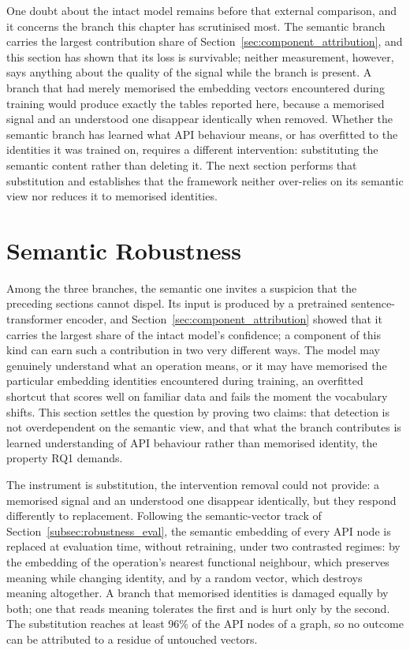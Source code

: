 \documentclass[%
    BCOR=10mm,
    DIV=13,
    toc=bibliography,
    toc=listof,
    oneside,
    12pt,
]{scrbook}
\begin{document}
One doubt about the intact model remains before that external comparison,
and it concerns the branch this chapter has scrutinised most. The semantic
branch carries the largest contribution share of
Section~\ref{sec:component_attribution}, and this section has shown that its
loss is survivable; neither measurement, however, says anything about the
quality of the signal while the branch is present. A branch that had merely
memorised the embedding vectors encountered during training would produce
exactly the tables reported here, because a memorised signal and an
understood one disappear identically when removed. Whether the semantic
branch has learned what API behaviour means, or has overfitted to the
identities it was trained on, requires a different intervention: substituting
the semantic content rather than deleting it. The next section performs that
substitution and establishes that the framework neither over-relies on its
semantic view nor reduces it to memorised identities.


\section{Semantic Robustness}
\label{sec:robustness_results}

Among the three branches, the semantic one invites a suspicion that the
preceding sections cannot dispel. Its input is produced by a pretrained
sentence-transformer encoder, and
Section~\ref{sec:component_attribution} showed that it carries the largest
share of the intact model's confidence; a component of this kind can earn
such a contribution in two very different ways. The model may genuinely
understand what an operation means, or it may have memorised the particular
embedding identities encountered during training, an overfitted shortcut
that scores well on familiar data and fails the moment the vocabulary
shifts. This section settles the question by proving two claims: that
detection is not overdependent on the semantic view, and that what the
branch contributes is learned understanding of API behaviour rather than
memorised identity, the property RQ1 demands.

The instrument is substitution, the intervention removal could not provide:
a memorised signal and an understood one disappear identically, but they
respond differently to replacement. Following the semantic-vector track of
Section~\ref{subsec:robustness_eval}, the semantic embedding of every API
node is replaced at evaluation time, without retraining, under two
contrasted regimes: by the embedding of the operation's nearest functional
neighbour, which preserves meaning while changing identity, and by a random
vector, which destroys meaning altogether. A branch that memorised
identities is damaged equally by both; one that reads meaning tolerates the
first and is hurt only by the second. The substitution reaches at least
96\% of the API nodes of a graph, so no outcome can be attributed
to a residue of untouched vectors.
\end{document}
